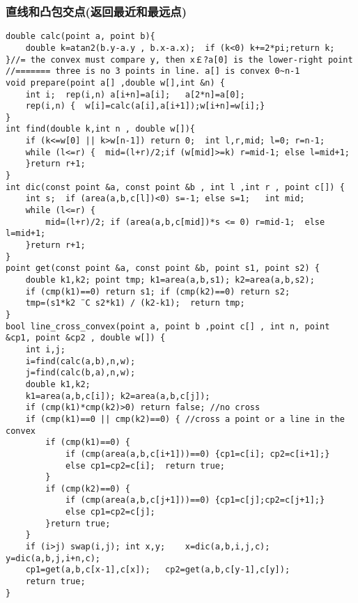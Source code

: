 \documentclass[landscape,a4paper]{article}
\begin{document}
\begin{spacing}{0.3}
\begin{multicols}{3}
\subsubsection{直线和凸包交点(返回最近和最远点)}
\begin{lstlisting}
double calc(point a, point b){
	double k=atan2(b.y-a.y , b.x-a.x);	if (k<0) k+=2*pi;return k;
}//= the convex must compare y, then x￡?a[0] is the lower-right point
//======= three is no 3 points in line. a[] is convex 0~n-1
void prepare(point a[] ,double w[],int &n) {
	int i;	rep(i,n) a[i+n]=a[i];	a[2*n]=a[0];
	rep(i,n) {	w[i]=calc(a[i],a[i+1]);w[i+n]=w[i];}
}
int find(double k,int n , double w[]){
	if (k<=w[0] || k>w[n-1]) return 0;	int l,r,mid; l=0; r=n-1;
	while (l<=r) {	mid=(l+r)/2;if (w[mid]>=k) r=mid-1; else l=mid+1;
	}return r+1;
}
int dic(const point &a, const point &b , int l ,int r , point c[]) {
	int s;	if (area(a,b,c[l])<0) s=-1; else s=1;	int mid;
	while (l<=r) {
		mid=(l+r)/2; if (area(a,b,c[mid])*s <= 0) r=mid-1;	else l=mid+1;
	}return r+1;
}
point get(const point &a, const point &b, point s1, point s2) {
	double k1,k2; point tmp; k1=area(a,b,s1); k2=area(a,b,s2);
	if (cmp(k1)==0) return s1; if (cmp(k2)==0) return s2;
	tmp=(s1*k2 ¨C s2*k1) / (k2-k1);  return tmp;
}
bool line_cross_convex(point a, point b ,point c[] , int n, point &cp1, point &cp2 , double w[]) {
	int i,j;
	i=find(calc(a,b),n,w);
	j=find(calc(b,a),n,w);
	double k1,k2;
	k1=area(a,b,c[i]); k2=area(a,b,c[j]);
	if (cmp(k1)*cmp(k2)>0) return false; //no cross	
	if (cmp(k1)==0 || cmp(k2)==0) {	//cross a point or a line in the convex
		if (cmp(k1)==0) {
			if (cmp(area(a,b,c[i+1]))==0) {cp1=c[i]; cp2=c[i+1];}
			else cp1=cp2=c[i];  return true;
		}
		if (cmp(k2)==0) {
			if (cmp(area(a,b,c[j+1]))==0) {cp1=c[j];cp2=c[j+1];}
			else cp1=cp2=c[j];
		}return true;
	}
	if (i>j) swap(i,j); int x,y;	x=dic(a,b,i,j,c); y=dic(a,b,j,i+n,c);
	cp1=get(a,b,c[x-1],c[x]);	cp2=get(a,b,c[y-1],c[y]);
	return true;
}
\end{lstlisting}

\end{multicols}
\end{spacing}
\end{document}
